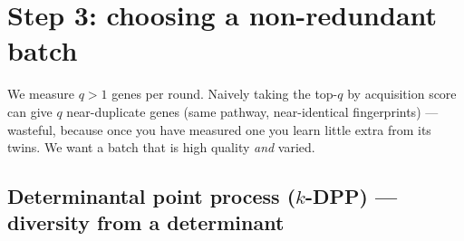 \documentclass[11pt]{article}
\begin{document}
\section{Step 3: choosing a non-redundant batch}

We measure $q>1$ genes per round. Naively taking the top-$q$ by acquisition score can give
$q$ near-duplicate genes (same pathway, near-identical fingerprints) --- wasteful, because
once you have measured one you learn little extra from its twins. We want a batch that is
high quality \emph{and} varied.

\subsection{Determinantal point process ($k$-DPP) --- diversity from a determinant}
\end{document}
